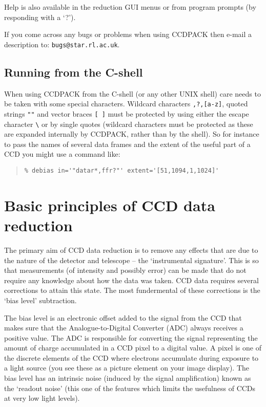 \documentclass[twoside,11pt]{article}
\newcommand{\xlabel}[1]{}
\renewcommand{\_}{\texttt{\symbol{95}}}
\newenvironment{myquote}{\begin{quote}\begin{small}}{\end{small}\end{quote}}
\newcommand{\text}[1]{{\small \tt #1}}
\begin{document}
Help is also available in the reduction GUI menus or from program
prompts (by responding with a `?').

If you come across any bugs or problems when using CCDPACK then e-mail
a description to: \texttt{bugs@star.rl.ac.uk}.

\subsection{Running from the C-shell}
When using CCDPACK from the C-shell (or any other UNIX shell) care needs to
be taken with some special characters.
Wildcard characters \text{*,?,[a-z]}, quoted strings \text{""}
and vector braces \text{[ ]} must be protected by using either the
escape character {\small \verb+\+} or by single quotes (wildcard characters
must be protected as these are expanded internally by CCDPACK, rather than by
the shell).
So for instance to pass the names of several data frames and the extent
of the useful part of a CCD you might use a command like:
\begin{myquote}
\begin{verbatim}
% debias in='"datar*,ffr?"' extent='[51,1094,1,1024]'
\end{verbatim}
\end{myquote}

\section{Basic principles of CCD data reduction\xlabel{CCDprinciples}}

The primary aim of CCD data reduction is to remove any effects that are
due to the nature of the detector and telescope -- the `instrumental
signature'.
This is so that measurements (of intensity and possibly error) can be
made that do not require any knowledge about how the data was taken.
CCD data requires several corrections to attain this state.
The most fundermental of these corrections is the `bias level' subtraction.

The bias level is an electronic offset added to the signal from the
CCD that makes sure that the Analogue-to-Digital Converter (ADC)
always receives a positive value.
The ADC is responsible for converting the signal representing
the amount of charge accumulated in a CCD pixel to a digital value.
A pixel is one of the discrete elements of the CCD where electrons
accumulate during exposure to a light source (you see these as a
picture element on your image display).
The bias level has an intrinsic noise (induced by the signal
amplification) known as the `readout noise' (this one of the features
which limits the usefulness of CCDs at very low light levels).
\end{document}
